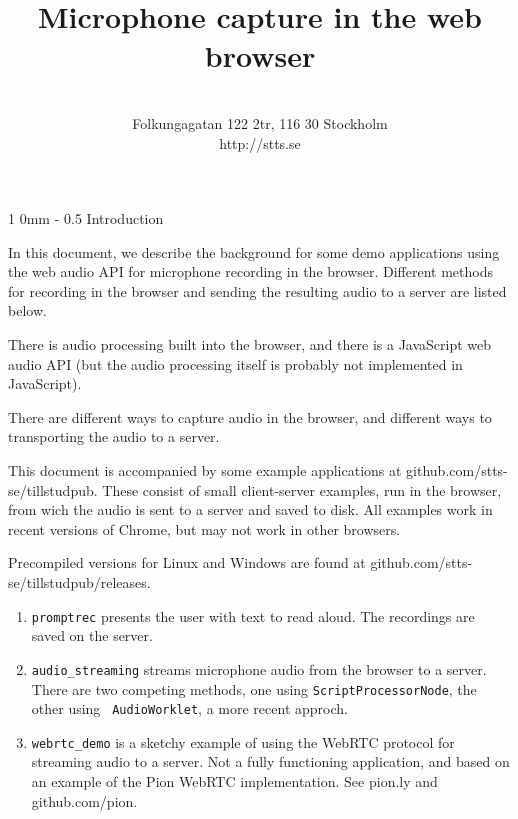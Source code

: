 \documentclass[11pt, a4paper, twoside]{article}
\title{ Microphone capture in the web browser }
\author{ \stts \\
  Folkungagatan 122 2tr, 116 30 Stockholm\\
  http://stts.se }
\makeatletter
\renewcommand{\section}{\@startsection
  {section}%
  {1}%
  {0mm}%
  {-\baselineskip}%
  {0.5\baselineskip}%
  {\bfseries\sffamily\Large}}%
\makeatother
\begin{document}
\maketitle
\cfoot{\thepage (\pageref{LastPage})}  

\tableofcontents

\newpage

\section{Introduction}

In this document, we describe the background for some demo
applications using the web audio API for microphone recording in the
browser.  Different methods for recording in the browser and sending
the resulting audio to a server are listed below. 

There is audio processing built into the browser, and there is a
JavaScript web audio API (but the audio processing itself is probably not
implemented in JavaScript).

There are different ways to capture audio in the browser, and
different ways to transporting the audio to a server.

This document is accompanied by some example applications at
github.com/stts-se/tillstudpub. These consist of small client-server
examples, run in the browser, from wich the audio is sent to a server
and saved to disk. All examples work in recent versions of Chrome, but
may not work in other browsers.

Precompiled versions for Linux and Windows are
found at github.com/stts-se/tillstudpub/releases.


\begin{enumerate}
\item {\tt promptrec} presents the user with text to read aloud. The
  recordings are saved on the server.

\item {\tt audio\_streaming} streams microphone audio from the browser
  to a server. There are two competing methods, one
  using { \tt ScriptProcessorNode}, the other using {\tt
    AudioWorklet}, a more recent approch.

\item {\tt webrtc\_demo} is a sketchy example of using the WebRTC
  protocol for streaming audio to a server. Not a fully functioning
  application, and based on an example of the Pion WebRTC implementation.
  See pion.ly and github.com/pion.
  
\end{enumerate}
\end{document}
